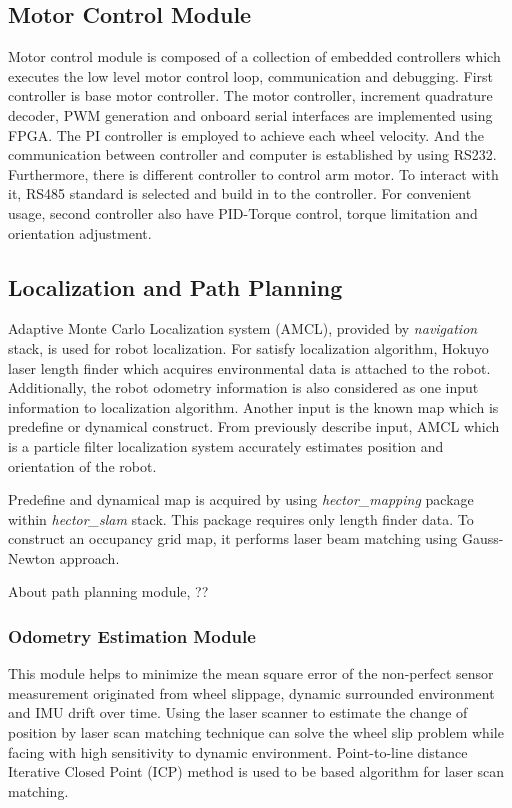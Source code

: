 \documentclass{llncs}
\begin{document}
\subsection{Motor Control Module}

Motor control module is composed of a collection of embedded controllers which executes the low level motor control loop, communication and debugging. First controller is base motor controller. The motor controller, increment quadrature decoder, PWM generation and onboard serial interfaces are implemented using FPGA. The PI controller is employed to achieve each wheel velocity. And the communication between controller and computer is established by using RS232. Furthermore, there is different controller to control arm motor. To interact with it, RS485 standard is selected and build in to the controller. For convenient usage, second controller also have PID-Torque control, torque limitation and orientation adjustment\cite{con_arm}. 

\subsection{Localization and Path Planning}

Adaptive Monte Carlo Localization system (AMCL), provided by \textit{navigation} stack, is used for robot localization. For satisfy localization algorithm, Hokuyo laser length finder which acquires environmental data is attached to the robot. Additionally, the robot odometry information is also considered as one input information to localization algorithm. Another input is the known map which is predefine or dynamical construct. From previously describe input, AMCL which is a particle filter localization system accurately estimates position and orientation of the robot.

Predefine and dynamical map is acquired by using \textit{hector\_mapping} package within \textit{hector\_slam} stack. This package requires only length finder data. To construct an occupancy grid map, it performs laser beam matching using Gauss-Newton approach\cite{hector_slam}.

About path planning module, ??

\subsubsection{Odometry Estimation Module}

This module helps to minimize the mean square error of the non-perfect sensor measurement originated from wheel slippage, dynamic surrounded environment and IMU drift over time. Using the laser scanner to estimate the change of position by laser scan matching technique can solve the wheel slip problem while facing with high sensitivity to dynamic environment. Point-to-line distance Iterative Closed Point (ICP)\cite{icp1}\cite{icp2} method is used to be based algorithm for laser scan matching.
\end{document}
